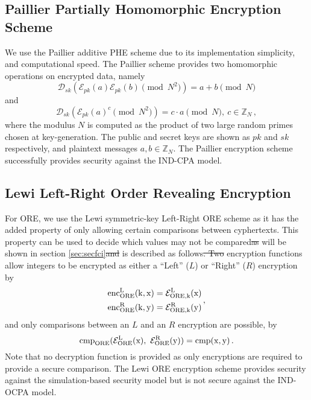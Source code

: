 \documentclass[letterpaper, 10 pt, journal, twoside]{ieeetran}  %
\providecommand{\DIFadd}[1]{{\protect\color{blue}\uwave{#1}}} %
\providecommand{\DIFdel}[1]{{\protect\color{red}\sout{#1}}}                      %
\providecommand{\DIFaddbegin}{} %
\providecommand{\DIFaddend}{} %
\providecommand{\DIFdelbegin}{} %
\providecommand{\DIFdelend}{} %
\begin{document}
\subsection{Paillier Partially Homomorphic Encryption Scheme} \label{subsec:paillier}
We use the Paillier additive PHE scheme due to its implementation simplicity, and computational speed. The Paillier scheme provides two homomorphic operations on encrypted data, namely
\begin{equation}
   \mathcal{D}_{sk}(\mathcal{E}_{pk}(a)\mathcal{E}_{pk}(b) \!\!\pmod{N^{2}}) = a + b \!\!\pmod{N} \label{eqn:paillier_add}
\end{equation}
and
\begin{equation}
   \mathcal{D}_{sk}(\mathcal{E}_{pk}(a)^c \!\!\pmod{N^{2}}) = c\cdot a \!\!\pmod{N},\ c \in \mathbb{Z}_N\,, \label{eqn:paillier_mult}
\end{equation}
where the modulus $N$ is computed as the product of two large random primes chosen at key-generation. The public and secret keys are shown as $pk$ and $sk$ respectively, and plaintext messages $a,b \in \mathbb{Z}_N$. The Paillier encryption scheme successfully provides security against the IND-CPA model.

\subsection{Lewi Left-Right Order Revealing Encryption} \label{subsec:lewi}
For ORE, we use the Lewi symmetric-key Left-Right ORE scheme as it has the added property of only allowing certain comparisons between cyphertexts. This property can be used to decide which values may not be compared\DIFdelbegin \DIFdel{as }\DIFdelend \DIFaddbegin \DIFadd{, which }\DIFaddend will be shown in section \ref{sec:secfci}\DIFdelbegin \DIFdel{and }\DIFdelend \DIFaddbegin \DIFadd{. It }\DIFaddend is described as follows\DIFdelbegin \DIFdel{. Two }\DIFdelend \DIFaddbegin \DIFadd{: two }\DIFaddend encryption functions allow integers to be encrypted as either a ``Left'' ($L$) or ``Right'' ($R$) encryption by
\begin{equation}
   \begin{aligned} \label{eqn:lewi_l_r}
      &\operatorfont{enc}^L_{ORE}(k, x) = \mathcal{E}^L_{ORE,k}(x) \\
      &\operatorfont{enc}^R_{ORE}(k, y) = \mathcal{E}^R_{ORE,k}(y)
   \end{aligned}\,,
\end{equation}
and only comparisons between an $L$ and an $R$ encryption are possible, by
\begin{equation}
   \operatorfont{cmp}_{ORE}(\mathcal{E}^L_{ORE}(x),\ \mathcal{E}^R_{ORE}(y)) = \operatorfont{cmp}(x, y)\,. \label{eqn:lewi_cmp}
\end{equation}
Note that no decryption function is provided as only encryptions are required to provide a secure comparison. The Lewi ORE encryption scheme provides security against the simulation-based security model \cite{chenettePracticalOrderRevealingEncryption2016} but is not secure against the IND-OCPA model.
\end{document}

